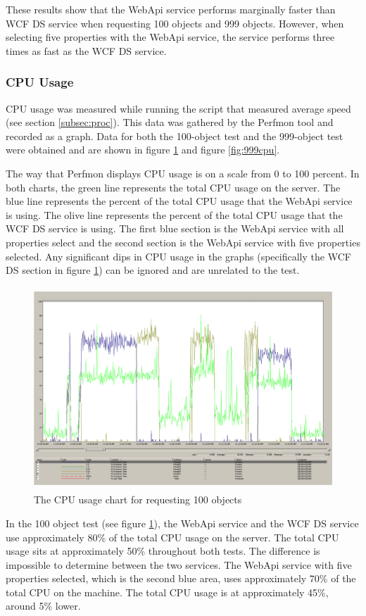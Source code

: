 \documentclass[se]{uw-wkrpt}
\begin{document}
These results show that the WebApi service performs marginally faster than WCF DS service when requesting 100 objects and 999 objects. However, when selecting five properties with the WebApi service, the service performs three times as fast as the WCF DS service.

\subsubsection{CPU Usage}

CPU usage was measured while running the script that measured average speed (see section \ref{subsec:proc}). This data was gathered by the Perfmon tool and recorded as a graph. Data for both the 100-object test and the 999-object test were obtained and are shown in figure \ref{fig:100cpu} and figure \ref{fig:999cpu}.

The way that Perfmon displays CPU usage is on a scale from 0 to 100 percent. In both charts, the green line represents the total CPU usage on the server. The blue line represents the percent of the total CPU usage that the WebApi service is using. The olive line represents the percent of the total CPU usage that the WCF DS service is using. The first blue section is the WebApi service with all properties select and the second section is the WebApi service with five properties selected. Any significant dips in CPU usage in the graphs (specifically the WCF DS section in figure \ref{fig:100cpu}) can be ignored and are unrelated to the test.

\begin{figure}
  \centering
  \includegraphics[height=3in]{100CPU}
  \caption{The CPU usage chart for requesting 100 objects}
  \label{fig:100cpu}
\end{figure}

In the 100 object test (see figure \ref{fig:100cpu}), the WebApi service and the WCF DS service use approximately 80\% of the total CPU usage on the server. The total CPU usage sits at approximately 50\% throughout both tests. The difference is impossible to determine between the two services. The WebApi service with five properties selected, which is the second blue area, uses approximately 70\% of the total CPU on the machine. The total CPU usage is at approximately 45\%, around 5\% lower.
\end{document}
